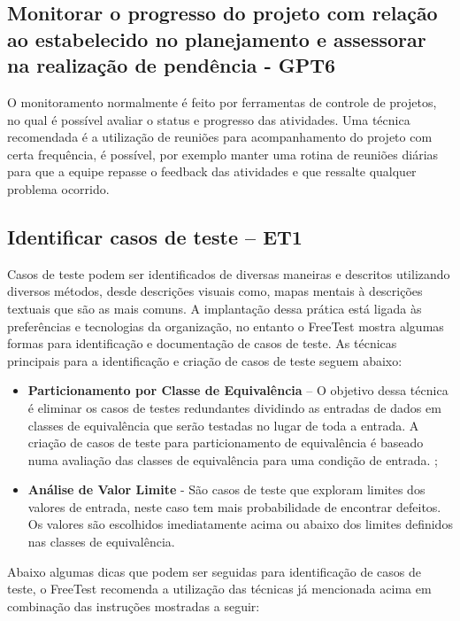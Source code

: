 \subsection{Monitorar o progresso do projeto com relação ao estabelecido no planejamento e assessorar na realização de pendência - GPT6}
\label{sec:guiagpt6}

O monitoramento normalmente é feito por ferramentas de controle de projetos, no qual é possível avaliar o status e progresso das atividades. Uma técnica recomendada é a utilização de reuniões para acompanhamento do projeto com certa frequência, é possível, por exemplo manter uma rotina de reuniões diárias para que a equipe repasse o feedback das atividades e que ressalte qualquer problema ocorrido.

\subsection{Identificar casos de teste – ET1}
\label{sec:guiaet1}

Casos de teste podem ser identificados de diversas maneiras e descritos utilizando diversos métodos, desde descrições visuais como, mapas mentais à descrições textuais que são as mais comuns. A implantação dessa prática está ligada às preferências e tecnologias da organização, no entanto o FreeTest mostra algumas formas para identificação e documentação de casos de teste. As técnicas principais para a identificação e criação de casos de teste seguem abaixo:

\begin{itemize}
    \item \textbf{Particionamento por Classe de Equivalência} – O objetivo dessa técnica é eliminar os casos de testes redundantes dividindo as entradas de dados em classes de equivalência que serão testadas no lugar de toda a entrada. A criação de casos de teste para particionamento de equivalência é baseado numa avaliação das classes de equivalência para uma condição de entrada. ;
    \item \textbf{Análise de Valor Limite} - São casos de teste que exploram limites dos valores de entrada, neste caso tem mais probabilidade de encontrar defeitos. Os valores são escolhidos imediatamente acima ou abaixo dos limites definidos nas classes de equivalência.
\end{itemize}

Abaixo algumas dicas que podem ser seguidas para identificação de casos de teste, o FreeTest recomenda a utilização das técnicas já mencionada acima em combinação das instruções mostradas a seguir:

